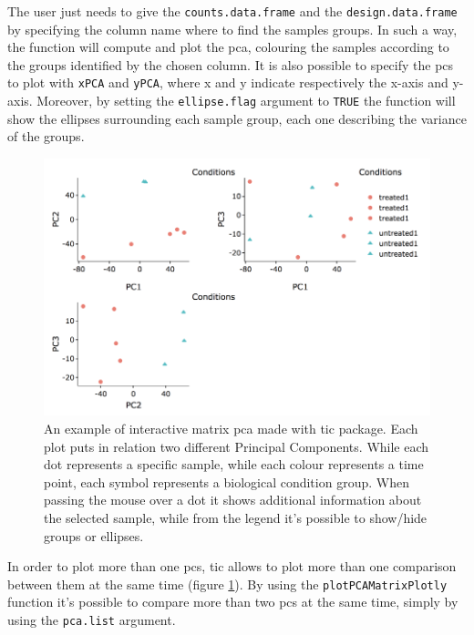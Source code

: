 The user just needs to give the \lstinline!counts.data.frame! and the \lstinline!design.data.frame! by specifying the column name where to find the samples groups.
In such a way, the function will compute and plot the \gls{pca}, colouring the samples according to the groups identified by the chosen column.
It is also possible to specify the \glspl{pc} to plot with \lstinline!xPCA! and \lstinline!yPCA!, where x and y indicate respectively the x-axis and y-axis.
Moreover, by setting the \lstinline!ellipse.flag! argument to \lstinline!TRUE!  the function will show the ellipses surrounding each sample group, each one describing the variance of the groups.

\begin{figure}[H]
\centering
\includegraphics[width=\textwidth, keepaspectratio]{img/ticorser/pcas.png}
\caption[ticorser pca]{An example of interactive matrix \gls{pca} made with \gls{tic} package. Each plot puts in relation two different Principal Components. While each dot represents a specific sample, while each colour represents a time point, each symbol represents a biological condition group. When passing the mouse over a dot it shows additional information about the selected sample, while from the legend it's possible to show/hide groups or ellipses.}
\label{fig:ticorserpcas}
\end{figure}

In order to plot more than one \glspl{pc}, \gls{tic} allows to plot more than one comparison between them at the same time (figure \ref{fig:ticorserpcas}).
By using the \lstinline!plotPCAMatrixPlotly! function it's possible to compare more than two \glspl{pc} at the same time, simply by using the \lstinline!pca.list! argument.



